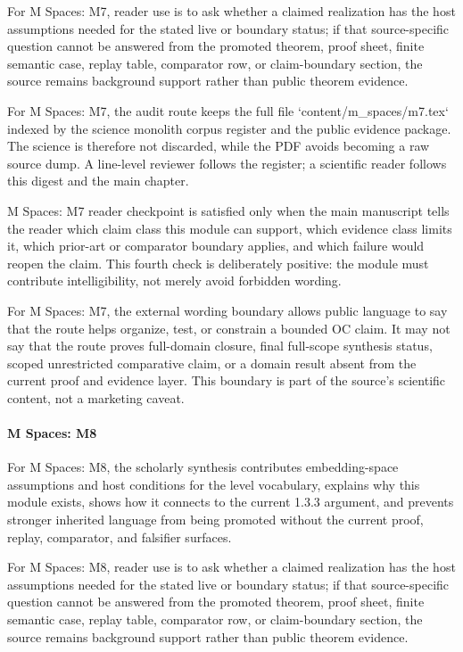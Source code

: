 For M Spaces: M7, reader use is to ask whether a claimed realization has the host assumptions needed for the stated live or boundary status; if that source-specific question cannot be answered from the promoted theorem, proof sheet, finite semantic case, replay table, comparator row, or claim-boundary section, the source remains background support rather than public theorem evidence.


For M Spaces: M7, the audit route keeps the full file `content/m\_spaces/m7.tex` indexed by the science monolith corpus register and the public evidence package. The science is therefore not discarded, while the PDF avoids becoming a raw source dump. A line-level reviewer follows the register; a scientific reader follows this digest and the main chapter.


M Spaces: M7 reader checkpoint is satisfied only when the main manuscript tells the reader which claim class this module can support, which evidence class limits it, which prior-art or comparator boundary applies, and which failure would reopen the claim. This fourth check is deliberately positive: the module must contribute intelligibility, not merely avoid forbidden wording.


For M Spaces: M7, the external wording boundary allows public language to say that the route helps organize, test, or constrain a bounded OC claim. It may not say that the route proves full-domain closure, final full-scope synthesis status, scoped unrestricted comparative claim, or a domain result absent from the current proof and evidence layer. This boundary is part of the source's scientific content, not a marketing caveat.


\paragraph{M Spaces: M8}

For M Spaces: M8, the scholarly synthesis contributes embedding-space assumptions and host conditions for the level vocabulary, explains why this module exists, shows how it connects to the current 1.3.3 argument, and prevents stronger inherited language from being promoted without the current proof, replay, comparator, and falsifier surfaces.


For M Spaces: M8, reader use is to ask whether a claimed realization has the host assumptions needed for the stated live or boundary status; if that source-specific question cannot be answered from the promoted theorem, proof sheet, finite semantic case, replay table, comparator row, or claim-boundary section, the source remains background support rather than public theorem evidence.


